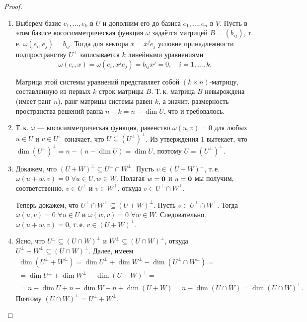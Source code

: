 \begin{proof}
    \begin{enumerate}
        \item Выберем базис $e_1, \ldots, e_k$ в $U$ и дополним его до базиса $e_1, \ldots, e_n$ в $V$. Пусть в этом базисе кососимметрическая функция $\omega$ задаётся матрицей $B = (b_{ij})$, т.\,е. $\omega(e_i, e_j) = b_{ij}$. Тогда для вектора $x = x^je_j$ условие принадлежности подпространству $U^\perp$ записывается $k$ линейными уравнениями
            \[
                \omega(e_i, x) = \omega(e_i, x^je_j) = b_{ij}x^j = 0,\quad i = 1, \ldots, k.
            \]

            Матрица этой системы уравнений представляет собой $(k \times n)$-матрицу, составленную из первых $k$ строк матрицы $B$. Т.\,к. матрица $B$ невырождена (имеет ранг $n$), ранг матрицы системы равен $k$, а значит, размерность пространства решений равна $n - k = n - \dim U$, что и требовалось.
        \item Т.\,к. $\omega$ --- кососимметрическая функция, равенство $\omega(u, v) = 0$ для любых $u \in U$ и $v \in U^\perp$ означает, что $U \subseteq (U^\perp)^\perp$. Из утверждения 1 вытекает, что $\dim(U^\perp)^\perp = n - (n - \dim U) = \dim U$, поэтому $U = (U^\perp)^\perp$.
        \item Докажем, что $(U + W)^\perp \subseteq U^\perp \cap W^\perp$. Пусть $v \in (U + W)^\perp$, т.\,е. $\omega(u + w, v) = 0$ $\forall u \in U, w \in W$. Полагая $w = \boldsymbol{0}$ и $u = \boldsymbol{0}$ мы получим, соответственно, $v \in U^\perp$ и $v \in W^\perp$, откуда $v \in U^\perp \cap W^\perp$.

            Теперь докажем, что $U^\perp \cap W^\perp \subseteq (U + W)^\perp$. Пусть $v \in U^\perp \cap W^\perp$. Тогда $\omega(u, v) = 0$ $\forall u \in U$ и $\omega(w, v) = 0$ $\forall w \in W$. Следовательно. $\omega(u + w, v) = 0$, т.\,е. $v \in (U + W)^\perp$.
        \item Ясно, что $U^\perp \subseteq (U \cap W)^\perp$ и $W^\perp \subseteq (U \cap W)^\perp$, откуда $U^\perp + W^\perp \subseteq (U \cap W)^\perp$. Далее, имеем
            \begin{multline*}
                \dim(U^\perp + W^\perp) = \dim U^\perp + \dim W^\perp - \dim(U^\perp \cap W^\perp) =\\ = \dim U^\perp + \dim W^\perp - \dim(U + W)^\perp =\\ = n - \dim U + n - \dim W - n + \dim(U + W) = n - \dim(U \cap W) = \dim(U \cap W)^\perp.
            \end{multline*}
            Поэтому $(U \cap W)^\perp = U^\perp + W^\perp$.
    \end{enumerate}
\end{proof}

